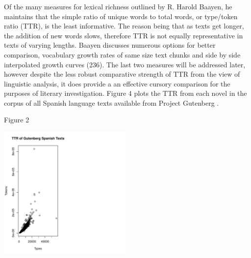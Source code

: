 Of the many measures for lexical richness outlined by R. Harold Baayen, he maintains that the simple ratio of unique words to total words, or type/token ratio (TTR), is the least informative. 
The reason being that as texts get longer, the addition of new words slows, therefore TTR is not equally representative in texts of varying lengths. 
Baayen discusses numerous options for better comparison, vocabulary growth rates of same size text chunks and side by side interpolated growth curves (236)\nocite{Baayen2008}.
The last two measures will be addressed later, however despite the less robust comparative strength of TTR from the view of linguistic analysis, it does provide a an effective cursory comparison for the purposes of literary investigation. 
Figure 4 plots the TTR from each novel in the corpus of all Spanish language texts available from Project Gutenberg \autocite{Project G}.


Figure 2


\begin{knitrout}
\color{fgcolor}
\includegraphics[width=250,height=250]{figure/Figure_2-1} 

\end{knitrout}


